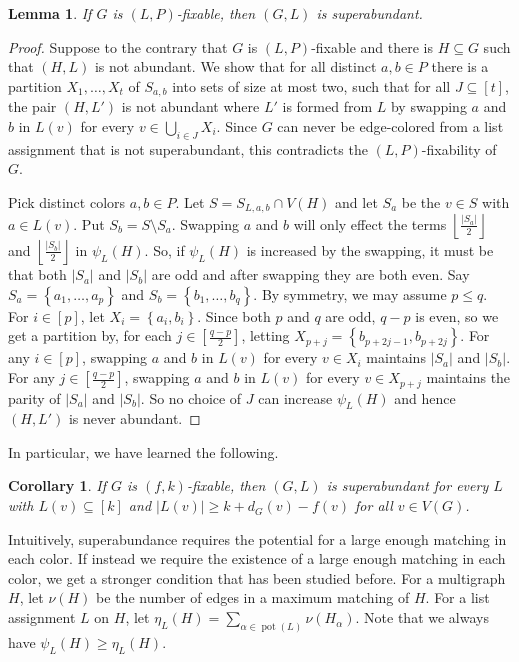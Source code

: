 \documentclass[12pt]{article}
\theoremstyle{plain}
\newtheorem{lem}[thm]{Lemma}
\newtheorem{cor}[thm]{Corollary}
\theoremstyle{definition}
\theoremstyle{remark}
\newcommand{\set}[1]{\left\{ #1 \right\}}
\newcommand{\card}[1]{\left|#1\right|}
\newcommand{\floor}[1]{\left\lfloor#1\right\rfloor}
\newcommand{\irange}[1]{\left[#1\right]}
\newcommand{\pot}{\operatorname{pot}}
\begin{document}
\begin{lem}\label{SuperabundanceIsNecessary}
If $G$ is $(L, P)$-fixable, then $(G, L)$ is superabundant.
\end{lem}
\begin{proof}
Suppose to the contrary that $G$ is $(L, P)$-fixable and there is $H \subseteq
G$ such that $(H, L)$ is not abundant. We show that for all distinct $a,b \in
P$ there is a partition $X_1, \ldots, X_t$ of $S_{a,b}$ into sets of size at
most two, such that for all $J \subseteq \irange{t}$, the pair $(H,L')$ is not
abundant where $L'$ is formed from $L$ by swapping $a$ and $b$ in $L(v)$ for
every $v \in \bigcup_{i \in J} X_i$.  Since $G$ can never be edge-colored from
a list assignment that is not superabundant, this contradicts the
$(L,P)$-fixability of $G$.

Pick distinct colors $a,b \in P$.  Let $S = S_{L,a,b} \cap V(H)$ and let $S_a$ be the
$v \in S$ with $a \in L(v)$.  Put $S_b = S\setminus S_a$.  Swapping $a$ and $b$
will only effect the terms $\floor{\frac{\card{S_a}}{2}}$ and
$\floor{\frac{\card{S_b}}{2}}$ in $\psi_L(H)$.  So, if $\psi_L(H)$ is increased
by the swapping, it must be that both $|S_a|$ and $|S_b|$ are odd and after
swapping they are both even.  Say $S_a = \set{a_1, \ldots,a_p}$ and $S_b =
\set{b_1, \ldots,b_q}$.  By symmetry, we may assume $p \le q$.  For $i \in
\irange{p}$, let $X_i = \set{a_i, b_i}$.  Since both $p$ and $q$ are odd, $q-p$
is even, so we get a partition by, for each $j \in \irange{\frac{q-p}{2}}$,
letting $X_{p + j} = \set{b_{p + 2j - 1}, b_{p + 2j}}$.  For any $i \in
\irange{p}$, swapping $a$ and $b$ in $L(v)$ for every $v \in X_i$ maintains
$|S_a|$ and $|S_b|$.  For any $j \in \irange{\frac{q-p}{2}}$, swapping $a$ and
$b$ in $L(v)$ for every $v \in X_{p+j}$ maintains the parity of $|S_a|$ and
$|S_b|$.  So no choice of $J$ can increase $\psi_L(H)$ and hence $(H,L')$ is
never abundant.
\end{proof}

In particular, we have learned the following.

\begin{cor}
	If $G$ is $(f,k)$-fixable, then $(G,L)$ is superabundant for every $L$ with $L(v) \subseteq \irange{k}$ and $|L(v)| \ge k + d_{G}(v) - f(v)$ for all $v \in V(G)$.
\end{cor}

Intuitively, superabundance requires the potential for a large enough matching in each color. If instead we require the existence of a large enough matching in each color, we get a stronger condition that has been studied before. For a multigraph $H$, let $\nu(H)$ be the number of edges in a maximum matching of $H$. 
For a list assignment $L$ on $H$, let $\eta_L(H) = \sum_{\alpha \in \pot(L)}
\nu(H_\alpha)$.  Note that we always have $\psi_L(H) \ge \eta_L(H)$.
\end{document}

